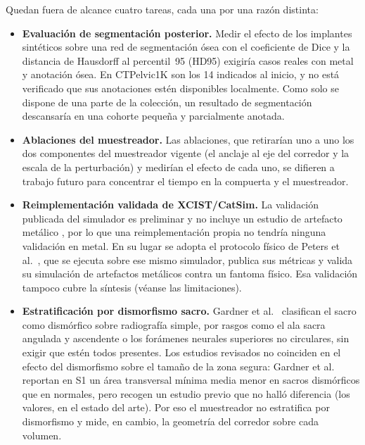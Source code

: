Quedan fuera de alcance cuatro tareas, cada una por una razón distinta:
\begin{itemize}
    \item \textbf{Evaluación de segmentación posterior.} Medir el efecto de los implantes sintéticos sobre una red de segmentación ósea con el coeficiente de Dice y la distancia de Hausdorff al percentil~95 (HD95) exigiría casos reales con metal y anotación ósea. En CTPelvic1K son los 14 indicados al inicio, y no está verificado que sus anotaciones estén disponibles localmente. Como solo se dispone de una parte de la colección, un resultado de segmentación descansaría en una cohorte pequeña y parcialmente anotada.
    \item \textbf{Ablaciones del muestreador.} Las ablaciones, que retirarían uno a uno los dos componentes del muestreador vigente (el anclaje al eje del corredor y la escala de la perturbación) y medirían el efecto de cada uno, se difieren a trabajo futuro para concentrar el tiempo en la compuerta y el muestreador.
    \item \textbf{Reimplementación validada de XCIST/CatSim.} La validación publicada del simulador es preliminar y no incluye un estudio de artefacto metálico \cite{wu2022xcist}, por lo que una reimplementación propia no tendría ninguna validación en metal. En su lugar se adopta el protocolo físico de Peters et al.~\cite{peters2025hybrid}, que se ejecuta sobre ese mismo simulador, publica sus métricas y valida su simulación de artefactos metálicos contra un fantoma físico. Esa validación tampoco cubre la síntesis (véanse las limitaciones).
    \item \textbf{Estratificación por dismorfismo sacro.} Gardner et al.~\cite{gardner2010safezones} clasifican el sacro como dismórfico sobre radiografía simple, por rasgos como el ala sacra angulada y ascendente o los forámenes neurales superiores no circulares, sin exigir que estén todos presentes. Los estudios revisados no coinciden en el efecto del dismorfismo sobre el tamaño de la zona segura: Gardner et al. reportan en S1 un área transversal mínima media menor en sacros dismórficos que en normales, pero recogen un estudio previo que no halló diferencia (los valores, en el estado del arte). Por eso el muestreador no estratifica por dismorfismo y mide, en cambio, la geometría del corredor sobre cada volumen.
\end{itemize}

